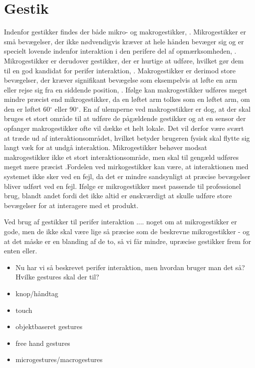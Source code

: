 \section{Gestik}
\label{Gestik}

Indenfor gestikker findes der både mikro- og makrogestikker, \parencite[s. 6]{PDF:UsabilityofMicroVsMacroGestures}. Mikrogestikker er små bevægelser, der ikke nødvendigvis kræver at hele hånden bevæger sig og er specielt lovende indenfor interaktion i den perifere del af opmærksomheden, \parencite[s. 95]{PDF:PeripheralInteraction}. Mikrogestikker er derudover gestikker, der er hurtige at udføre, hvilket gør dem til en god kandidat for perifer interaktion, \parencite[s. 96]{PDF:PeripheralInteraction}. Makrogestikker er derimod store bevægelser, der kræver signifikant bevægelse som eksempelvis at løfte en arm eller rejse sig fra en siddende position, \parencite[s. 6]{PDF:UsabilityofMicroVsMacroGestures]}. Ifølge \textcite[s. 9]{PDF:UsabilityofMicroVsMacroGestures} kan makrogestikker udføres meget mindre præcist end mikrogestikker, da en løftet arm tolkes som en løftet arm, om den er løftet 60$^{\circ}$ eller 90$^{\circ}$. En af ulemperne ved makrogestikker er dog, at der skal bruges et stort område til at udføre de pågældende gestikker og at en sensor der opfanger makrogestikker ofte vil dække et helt lokale. Det vil derfor være svært at træde ud af interaktionsområdet, hvilket betyder brugeren fysisk skal flytte sig langt væk for at undgå interaktion. Mikrogestikker behøver modsat makrogestikker ikke et stort interaktionsområde, men skal til gengæld udføres meget mere præcist \parencite[s. 10]{PDF:UsabilityofMicroVsMacroGestures}.Fordelen ved mirkogestikker kan være, at interaktionen med systemet ikke sker ved en fejl, da det er mindre sandsynligt at præcise bevægelser bliver udført ved en fejl. Ifølge \textcite[s. 10]{PDF:UsabilityofMicroVsMacroGestures} er mikrogestikker mest passende til professionel brug, blandt andet fordi det ikke altid er ønskværdigt at skulle udføre store bevægelser for at interagere med et produkt.

Ved brug af gestikker til perifer interaktion .... noget om at mikrogestikker er gode, men de ikke skal være lige så præcise som de beskrevne mikrogestikker - og at det måske er en blanding af de to, så vi får mindre, upræcise gestikker frem for enten eller. 


\begin{itemize}
	\item Nu har vi så beskrevet perifer interaktion, men hvordan bruger man det så? Hvilke gestures skal der til?
	\item knop/håndtag
	\item touch
	\item objektbaseret gestures
	\item free hand gestures
	\item microgestures/macrogestures
\end{itemize}
